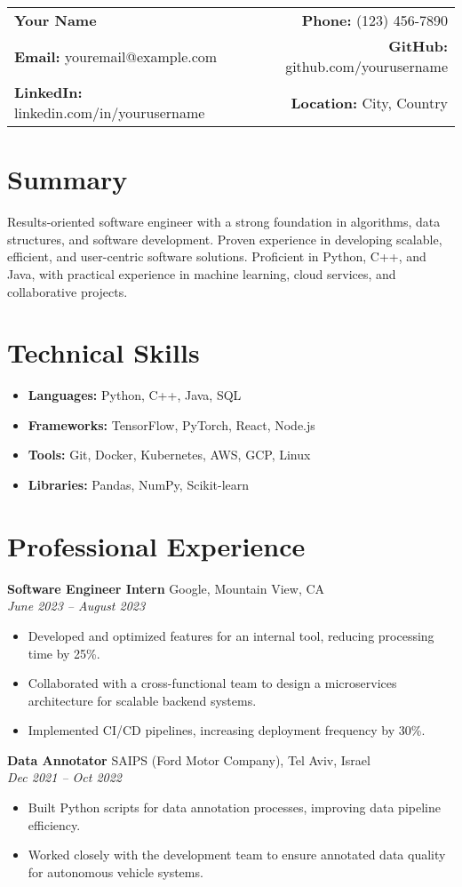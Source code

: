 \documentclass[a4paper,10pt]{article}
\makeatletter
\renewcommand{\maketitle}{
    \hspace{-1em}\begin{tabular*}{\textwidth}{l@{\extracolsep{\fill}}r}
        \textbf{\LARGE Your Name} & \textbf{Phone:} (123) 456-7890 \\
        \textbf{Email:} youremail@example.com & \textbf{GitHub:} github.com/yourusername \\
        \textbf{LinkedIn:} linkedin.com/in/yourusername & \textbf{Location:} City, Country \\
    \end{tabular*}
    \vspace{1em}
}
\makeatother
\begin{document}
\maketitle

\section*{Summary}
Results-oriented software engineer with a strong foundation in algorithms, data structures, and software development. Proven experience in developing scalable, efficient, and user-centric software solutions. Proficient in Python, C++, and Java, with practical experience in machine learning, cloud services, and collaborative projects.

\section*{Technical Skills}
\begin{itemize}[noitemsep,nolistsep]
    \item \textbf{Languages:} Python, C++, Java, SQL
    \item \textbf{Frameworks:} TensorFlow, PyTorch, React, Node.js
    \item \textbf{Tools:} Git, Docker, Kubernetes, AWS, GCP, Linux
    \item \textbf{Libraries:} Pandas, NumPy, Scikit-learn
\end{itemize}

\section*{Professional Experience}
\textbf{Software Engineer Intern} \hfill Google, Mountain View, CA \\
\textit{June 2023 -- August 2023}
\begin{itemize}[noitemsep,nolistsep]
    \item Developed and optimized features for an internal tool, reducing processing time by 25\%.
    \item Collaborated with a cross-functional team to design a microservices architecture for scalable backend systems.
    \item Implemented CI/CD pipelines, increasing deployment frequency by 30\%.
\end{itemize}

\textbf{Data Annotator} \hfill SAIPS (Ford Motor Company), Tel Aviv, Israel \\
\textit{Dec 2021 -- Oct 2022}
\begin{itemize}[noitemsep,nolistsep]
    \item Built Python scripts for data annotation processes, improving data pipeline efficiency.
    \item Worked closely with the development team to ensure annotated data quality for autonomous vehicle systems.
\end{itemize}
\end{document}
